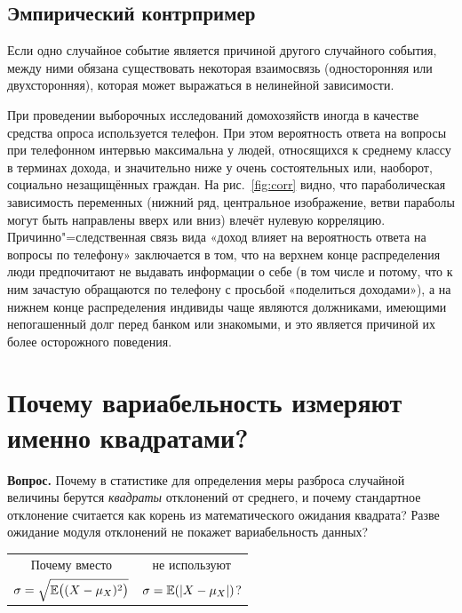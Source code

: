 \documentclass[11pt]{article}
\begin{document}
\subsection{Эмпирический контрпример}

Если одно случайное событие является причиной другого случайного события, между ними обязана существовать некоторая взаимосвязь (односторонняя или двухсторонняя), которая может выражаться в нелинейной зависимости.

При проведении выборочных исследований домохозяйств иногда в качестве средства опроса используется телефон. При этом вероятность ответа на вопросы при телефонном интервью максимальна у людей, относящихся к среднему классу в терминах дохода, и значительно ниже у очень состоятельных или, наоборот, социально незащищённых граждан. На рис.~\ref{fig:corr} видно, что параболическая зависимость переменных (нижний ряд, центральное изображение, ветви параболы могут быть направлены вверх или вниз) влечёт нулевую корреляцию. Причинно"=следственная связь вида «доход влияет на вероятность ответа на вопросы по телефону» заключается в том, что на верхнем конце распределения люди предпочитают не выдавать информации о себе (в том числе и потому, что к ним зачастую обращаются по телефону с просьбой «поделиться доходами»), а на нижнем конце распределения индивиды чаще являются должниками, имеющими непогашенный долг перед банком или знакомыми, и это является причиной их более осторожного поведения.



\section{Почему вариабельность измеряют именно квадратами?}

\textbf{Вопрос.} Почему в статистике для определения меры разброса случайной величины берутся \textit{квадраты} отклонений от среднего, и почему стандартное отклонение считается как корень из математического ожидания квадрата? Разве ожидание модуля отклонений не покажет вариабельность данных? 

\begin{center}
	\begin{tabular}{cc}
		\null\quad Почему вместо \quad\null & \null\quad не используют \quad\null \\
		$\sigma = \sqrt{\mathbb{E}\bigl( (X - \mu_X )^2 \bigr)}$ & $\sigma = \mathbb{E}(|X - \mu_X|)$?
	\end{tabular}
\end{center}
\end{document}
